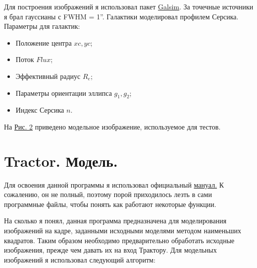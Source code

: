 \documentclass[12pt,a4paper]{article}
\begin{document}
Для построения изображений я использовал пакет \href{https://github.com/GalSim-developers/GalSim}{Galsim}. За точечные источники я брал гауссианы с FWHM = 1''. Галактики моделировал профилем Серсика. Параметры для галактик:
\begin{itemize}
    \item Положение центра $xc, yc$;
    \item Поток $Flux$;
    \item Эффективный радиус $R_e$;
    \item Параметры ориентации эллипса $g_1, g_2$;
    \item Индекс Серсика $n$.
\end{itemize}

На \hyperref[pic2]{Рис. 2} приведено модельное изображение, используемое для тестов.

\begin{figure}
 \label{pic2}
\end{figure}




\section{Tractor. Модель.}

Для освоения данной программы я использовал официальный \href{http://thetractor.readthedocs.org/en/latest/}{мануал.} К сожалению, он не полный, поэтому порой приходилось лезть в сами программные файлы, чтобы понять как работают некоторые функции.

На сколько я понял, данная программа предназначена для моделирования изображений на кадре, заданными исходными моделями методом наименьших квадратов. Таким образом необходимо предварительно обработать исходные изображения, прежде чем давать их на вход Трактору. Для модельных изображений я использовал следующий алгоритм:
\end{document}
